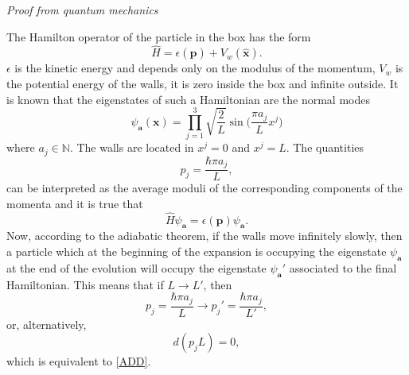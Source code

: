 \documentclass[useAMS,usenatbib,prd,twocolumn,nofootinbib]{revtex4-1}
\newcommand{\vect}[1]{\mathbf{{#1}}}
\begin{document}
\textit{Proof from quantum mechanics}

The Hamilton operator of the particle in the box has the form
\begin{equation}
\hat{H} = \epsilon(\hat{\vect{p}})+ V_{w}(\hat{\vect{x}}).
\end{equation}
$\epsilon$ is the kinetic energy and depends only on the modulus of the momentum, $V_w$ is the potential energy of the walls, it is zero inside the box and infinite outside. It is known that the eigenstates of such a Hamiltonian are the normal modes 
\begin{equation}
\psi_{\vect{a}} (\vect{x}) =   \prod_{j=1}^3 \sqrt{\dfrac{2}{L}} \sin \bigg( \dfrac{\pi a_j}{L} x^j \bigg)
\end{equation}
where $a_j \in \mathbb{N}$. The walls are located in $x^j =0$ and $x^j =L$. The quantities
\begin{equation}
p_j = \dfrac{\hbar \pi a_j}{L} ,
\end{equation}
can be interpreted as the average moduli of the corresponding components of the momenta and it is true that
\begin{equation}
\hat{H} \psi_{\vect{a}} = \epsilon(\vect{p}) \psi_{\vect{a}} . 
\end{equation}
Now, according to the adiabatic theorem, if the walls move infinitely slowly, then a particle which at the beginning of the expansion is occupying the eigenstate $\psi_{\vect{a}}$ at the end of the evolution will occupy the eigenstate $\psi_{\vect{a}}'$ associated to the final Hamiltonian. This means that if $L \rightarrow L'$, then
\begin{equation}
p_j = \dfrac{\hbar \pi a_j}{L}  \longrightarrow p_j' = \dfrac{\hbar \pi a_j}{L'},
\end{equation}
or, alternatively,
\begin{equation}
d (p_j L) =0,
\end{equation}
which is equivalent to \eqref{ADD}. 
\\
\end{document}
